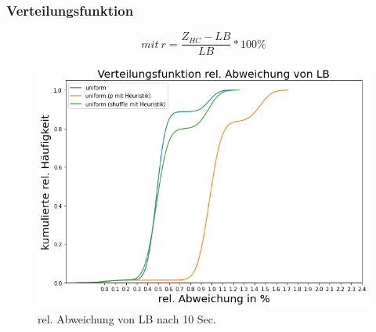 \documentclass{beamer}
\begin{document}
\begin{frame}

\frametitle{Verteilungsfunktion}

\begin{footnotesize}
\begin{equation}
mit \ r = \frac{Z_{HC}-LB}{LB} * 100\%
\end{equation}
\end{footnotesize}

\begin{figure}[!htbp]
\begin{center}
\includegraphics[scale=0.3]{img/dist3.png}
\end{center}
\caption{rel. Abweichung von LB nach 10 Sec.}
\label{fig:architecture}
\end{figure}



\end{frame}
\end{document}

